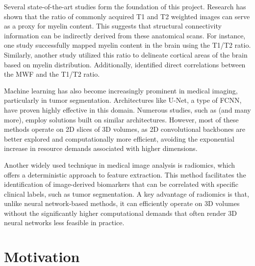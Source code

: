 Several state-of-the-art studies form the foundation of this project. Research has shown that the ratio of commonly acquired T1 and T2 weighted images can serve as a proxy for myelin content. This suggests that structural connectivity information can be indirectly derived from these anatomical scans. For instance, one study \cite{myelin2} successfully mapped myelin content in the brain using the T1/T2 ratio. Similarly, another study \cite{myelin} utilized this ratio to delineate cortical areas of the brain based on myelin distribution. Additionally, \cite{myelin3} identified direct correlations between the \ac{MWF} and the T1/T2 ratio.\par
Machine learning has also become increasingly prominent in medical imaging, particularly in tumor segmentation. Architectures like U-Net, a type of \ac{FCNN}, have proven highly effective in this domain. Numerous studies, such as \cite{unetseg} \cite{unetseg2} \cite{unetseg3} \cite{unetseg4} \cite{unetseg5} (and many more), employ solutions built on similar architectures. However, most of these methods operate on 2D slices of 3D volumes, as 2D convolutional backbones are better explored and computationally more efficient, avoiding the exponential increase in resource demands associated with higher dimensions.\par
Another widely used technique in medical image analysis is radiomics, which offers a deterministic approach to feature extraction. This method facilitates the identification of image-derived biomarkers that can be correlated with specific clinical labels, such as tumor segmentation. \cite{radioseg} \cite{radioseg2} \cite{radioseg3} A key advantage of radiomics is that, unlike neural network-based methods, it can efficiently operate on 3D volumes without the significantly higher computational demands that often render 3D neural networks less feasible in practice.

\section{Motivation}

